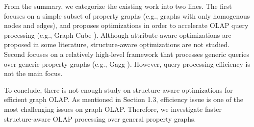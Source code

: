 	
	From the summary, we categorize the existing work into two lines. The first focuses on a simple subset of property graphs (e.g., graphs with only homogenous nodes and edges), and proposes optimizations in order to accelerate OLAP query processing (e.g., Graph Cube \cite{DBLP:conf/sigmod/ZhaoLXH11}). Although attribute-aware optimizations are proposed in some literature, structure-aware optimizations are not studied. Second focuses on a relatively high-level framework that processes generic queries over generic property graphs (e.g., Gagg \cite{DBLP:conf/esws/MaaliCD15}). However, query processing efficiency is not the main focus.
	
	To conclude, there is not enough study on structure-aware optimizations for efficient graph OLAP. As mentioned in Section 1.3, efficiency issue is one of the most challenging issues on graph OLAP. Therefore, we investigate faster structure-aware OLAP processing over general property graphs.
	
	
	
	
	
